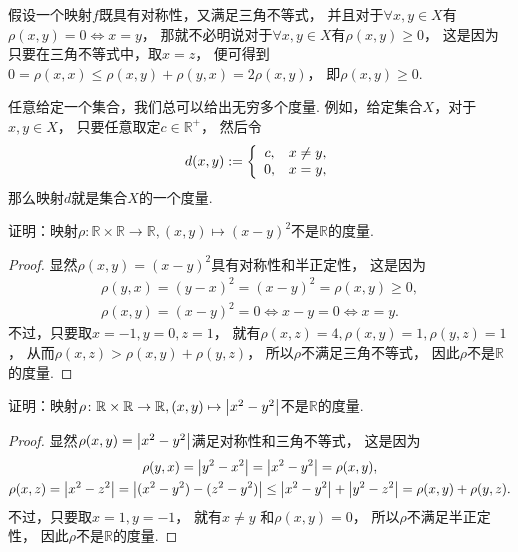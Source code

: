 \begin{remark}
假设一个映射\(f\)既具有对称性，又满足三角不等式，
并且对于\(\forall x,y \in X\)有\(\rho(x,y) = 0 \allowbreak\iff x = y\)，
那就不必明说对于\(\forall x,y \in X\)有\(\rho(x,y) \geq 0\)，
这是因为只要在三角不等式中，取\(x=z\)，
便可得到\(
	0
	= \rho(x,x)
	\leq \rho(x,y) + \rho(y,x)
	= 2 \rho(x,y)
\)，
即\(\rho(x,y)\geq0\).
\end{remark}

\begin{remark}
任意给定一个集合，我们总可以给出无穷多个度量.
例如，给定集合\(X\)，对于\(x,y \in X\)，
只要任意取定\(c\in\mathbb{R}^+\)，
然后令\begin{equation*}
	d(x,y) := \left\{ \begin{array}{cl}
		c, & x \neq y, \\
		0, & x=y,
	\end{array} \right.
\end{equation*}
那么映射\(d\)就是集合\(X\)的一个度量.
\end{remark}

\begin{example}
证明：映射\(
	\rho\colon \mathbb{R}\times\mathbb{R} \to \mathbb{R},
	(x,y) \mapsto (x-y)^2
\)不是\(\mathbb{R}\)的度量.
\begin{proof}
显然\(\rho(x,y) = (x-y)^2\)具有对称性和半正定性，
这是因为\begin{gather*}
	\rho(y,x)
	= (y-x)^2
	= (x-y)^2
	= \rho(x,y)
	\geq 0, \\
	\rho(x,y) = (x-y)^2 = 0 \iff x-y = 0 \iff x=y.
\end{gather*}
不过，只要取\(x=-1,y=0,z=1\)，
就有\(
	\rho(x,z)
	= 4,
	\rho(x,y)
	= 1,
	\rho(y,z)
	= 1
\)，
从而\(\rho(x,z) >\allowbreak \rho(x,y) +\allowbreak \rho(y,z)\)，
所以\(\rho\)不满足三角不等式，
因此\(\rho\)不是\(\mathbb{R}\)的度量.
\end{proof}
\end{example}

\begin{example}
证明：映射\(
	\rho\colon \mathbb{R}\times\mathbb{R} \to \mathbb{R},
	(x,y) \mapsto \abs{x^2-y^2}
\)不是\(\mathbb{R}\)的度量.
\begin{proof}
显然\(\rho(x,y) = \abs{x^2-y^2}\)满足对称性和三角不等式，
这是因为\begin{gather*}
	\rho(y,x)
	= \abs{y^2-x^2}
	= \abs{x^2-y^2}
	= \rho(x,y), \\
	\rho(x,z)
	= \abs{x^2-z^2}
	= \abs{(x^2-y^2)-(z^2-y^2)}
	\leq \abs{x^2-y^2} + \abs{y^2-z^2}
	= \rho(x,y) + \rho(y,z).
\end{gather*}
不过，只要取\(x=1,y=-1\)，
就有\(x \neq y\)
和\(
	\rho(x,y)
	= 0
\)，
所以\(\rho\)不满足半正定性，
因此\(\rho\)不是\(\mathbb{R}\)的度量.
\end{proof}
\end{example}

